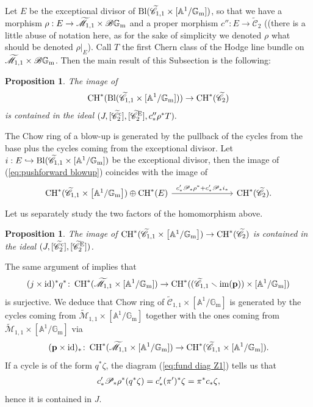 \documentclass[a4paper, 10pt]{amsart}
\numberwithin{equation}{section}
\numberwithin{subsection}{section}
\newtheorem{proposition}[theorem]{Proposition}
\theoremstyle{definition}
\theoremstyle{remark}
\renewcommand{\mathcal}{\mathscr}
\renewcommand\AA{\mathbb{A}} \newcommand\BB{\mathbb{B}}
\newcommand\GG{\mathbb{G}} \newcommand\HH{\mathbb{H}}
\newcommand\rmm{\mathrm{m}} \newcommand\rmn{\mathrm{n}}
\newcommand\arr{\ifinner\to\else\longrightarrow\fi}
\newcommand\im[1]{\operatorname{im}(#1)}
\newcommand\id{\mathrm{id}}
\newcommand{\gm}{\GG_{\rmm}}
\newcommand{\Mtilde}{\widetilde{\mathcal M}}
\newcommand{\Ctilde}{\widetilde{\mathcal C}}
\newcommand{\ch}[1][*]{\operatorname{CH}^{#1}}
\begin{document}
	Let $E$ be the exceptional divisor of $\rm{Bl}(\Ctilde_{1,1}\times [\AA^1/\gm])$, so that we have a morphism $\rho:E\to \Mtilde_{1,1}\times\cB\gm$ and a proper morphism $c'':E\to\Ctilde_2$ ((there is a little abuse of notation here, as for the sake of simplicity we denoted $\rho$ what should be denoted $\rho|_E$). Call $T$ the first Chern class of the Hodge line bundle on $\Mtilde_{1,1}\times\cB\gm$. Then the main result of this Subsection is the following:
	\begin{proposition}\label{prop:1-cusp whole}
		The image of 
		\begin{equation}\label{eq:pushforward blowup} \ch(\rm{Bl}(\Ctilde_{1,1}\times [\AA^1/\gm])) \arr \ch(\Ctilde_2) \end{equation}
		is contained in the ideal $(J,[\Ctilde_2^{\rm c}],[\Ctilde_2^{\rm E}],c''_*\rho^*T).$
	\end{proposition}
	The Chow ring of a blow-up is generated by the pullback of the cycles from the base plus the cycles coming from the exceptional divisor.
	Let $i:E\hookrightarrow \rm{Bl}(\Ctilde_{1,1}\times [\AA^1/\gm])$ be the exceptional divisor, then the image of (\ref{eq:pushforward blowup}) coincides with the image of
	\begin{equation}\label{eq:image blow-up}
		\begin{tikzcd}
			\ch(\Ctilde_{1,1}\times \left[\AA^1/\gm\right])\oplus\ch(E) \ar[rrr, "c'_*\cP_*\rho^* + c'_*\cP_*i_*"] & & & \ch(\Ctilde_2).
		\end{tikzcd}
	\end{equation}
	Let us separately study the two factors of the homomorphism above. 
	\begin{proposition}\label{prop:1-cusp}
		The image of $\ch(\Ctilde_{1,1}\times \left[\AA^1/\gm\right])\arr \ch(\Ctilde_2)$ is contained in the ideal $(J,[\Ctilde_2^{\rm c}],[\Ctilde_2^{\rm E}])$.
	\end{proposition}
	
	The same argument of  implies that
	\[ (j\times \id)^*q^*\colon\ch(\Mtilde_{1,1}\times [\AA^1/\gm])\arr\ch((\Ctilde_{1,1}\smallsetminus\im{\bfp})\times [\AA^1/\gm]) \]
	is surjective. We deduce that Chow ring of $\Ctilde_{1,1}\times[\AA^1/\gm]$ is generated by the cycles coming from $\Mtilde_{1,1}\times [\AA^1/\gm]$ together with the ones coming from $\Mtilde_{1,1}\times[\AA^1/\gm]$ via
	\[ (\bfp\times\rm{id})_*\colon\ch(\Mtilde_{1,1}\times[\AA^1/\gm])\arr\ch(\Ctilde_{1,1}\times[\AA^1/\gm]). \]
	If a cycle is of the form $q^*\zeta$, the diagram (\ref{eq:fund diag Z1}) tells us that
	\begin{align*} c'_*\cP_*\rho^*(q^*\zeta ) = c'_*(\pi')^*\zeta = \pi^*c_*\zeta,
	\end{align*}
	hence it is contained in $J$.
	
\end{document}
